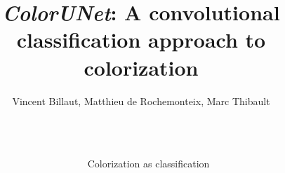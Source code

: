 \documentclass[final]{beamer}
\title{\textit{ColorUNet}: A convolutional classification approach to colorization} %
\author{Vincent Billaut, Matthieu de Rochemonteix, Marc Thibault} %
\institute{CS231n Final Project, 06/12/2018} %
\newlength{\sepwid}
\newlength{\onecolwid}
\begin{document}
\small
{} %

\setlength{\belowcaptionskip}{2ex} %
\setlength\belowdisplayshortskip{2ex} %

\begin{frame}[t] %

\begin{columns}[t] %

\begin{column}{\sepwid}\end{column} %

\begin{column}{\onecolwid} %





\begin{block}{Colorization as classification}


\end{block}
\end{column}
\end{columns}
\end{frame}
\end{document}
